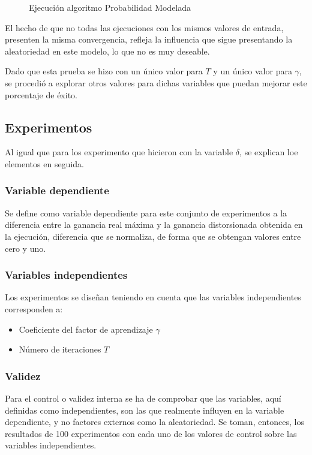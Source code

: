 \begin{figure}
\begin{subfigure}[b]{0.38\textwidth}
        \label{fig:tiger}
    \end{subfigure}    
    \caption{Ejecución algoritmo Probabilidad Modelada}
    \label{Ejecuta10}
\end{figure}

El hecho de que no todas las ejecuciones con los mismos valores de entrada, presenten la misma convergencia, refleja la influencia que sigue presentando la aleatoriedad en este modelo, lo que no es muy deseable.

Dado que esta prueba se hizo con un único valor para $T$ y un único valor para $\gamma$, se procedió a explorar otros valores para dichas variables que puedan mejorar este porcentaje de éxito.

\subsection{Experimentos}

Al igual que para los experimento que hicieron con la variable $\delta$, se explican loe elementos en seguida.

\subsubsection{Variable dependiente}

Se define como variable dependiente para este conjunto de experimentos a la diferencia entre la ganancia real máxima y la ganancia distorsionada obtenida en la ejecución, diferencia que se normaliza, de forma que se obtengan valores entre cero y uno.

\subsubsection{Variables independientes}
Los experimentos se diseñan teniendo en cuenta que las variables independientes corresponden a: 
\begin{itemize}
    \item Coeficiente del factor de aprendizaje $\gamma$
    \item Número de iteraciones $T$
\end{itemize}

\subsubsection{Validez}
Para el control o validez interna se ha de comprobar que las variables, aquí definidas como independientes, son las que realmente influyen en la variable dependiente, y no factores externos como la aleatoriedad. Se toman, entonces, los resultados de 100 experimentos con cada uno de los valores de control sobre las variables independientes.

